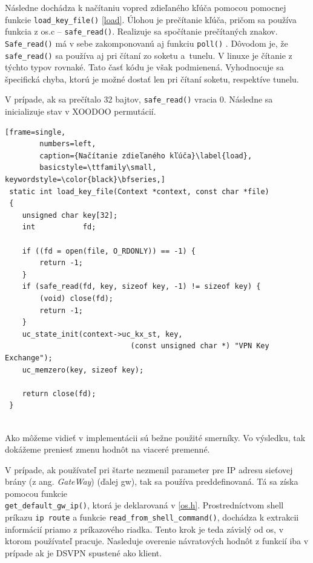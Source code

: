 Následne dochádza k načítaniu vopred zdieľaného kľúča pomocou pomocnej funkcie 
\lstinline|load_key_file()| \ref{load}. Úlohou je prečítanie kľúča, pričom sa používa funkcia z os.c -- \lstinline|safe_read()|. Realizuje sa spočítanie prečítaných znakov. \lstinline|Safe_read()| má v sebe zakomponovanú aj funkciu \lstinline|poll()| \cite{poll}. Dôvodom je, že \lstinline|safe_read()| sa používa aj pri čítaní zo soketu a~tunelu. V linuxe je čítanie z týchto typov rovnaké. Tato časť kódu je však podmienená. Vyhodnocuje sa špecifická chyba, ktorú je možné dostať len pri čítaní soketu, respektíve tunelu.  

V prípade, ak sa prečítalo 32 bajtov, \lstinline|safe_read()| vracia 0. Následne sa inicializuje stav v XOODOO permutácií.
 
 \begin{minipage}{\linewidth} 	
 	\begin{lstlisting}[frame=single,
 		numbers=left,
 		caption={Načítanie zdieľaného kľúča}\label{load},
 		basicstyle=\ttfamily\small, keywordstyle=\color{black}\bfseries,]
 static int load_key_file(Context *context, const char *file)
 {
 	unsigned char key[32];
 	int           fd;
 	
 	if ((fd = open(file, O_RDONLY)) == -1) {
 		return -1;
 	}
 	if (safe_read(fd, key, sizeof key, -1) != sizeof key) {
 		(void) close(fd);
 		return -1;
 	}
 	uc_state_init(context->uc_kx_st, key, 
 							 (const unsigned char *) "VPN Key Exchange");
 	uc_memzero(key, sizeof key);
 	
 	return close(fd);
 }
  	\end{lstlisting}
\end{minipage}\\ 
Ako môžeme vidieť v implementácii sú bežne použité smerníky. Vo výsledku, tak dokážeme preniesť zmenu hodnôt na viaceré premenné.
 
V prípade, ak používateľ pri štarte nezmenil parameter pre IP adresu sieťovej brány (z ang. \textit{GateWay}) (ďalej \acrshort{gw}), tak sa používa preddefinovaná. Tá sa získa pomocou funkcie \\\lstinline|get_default_gw_ip()|, ktorá je deklarovaná v \ref{os.h}. Prostredníctvom shell príkazu \lstinline|ip route| a funkcie \lstinline|read_from_shell_command()|, dochádza k extrakcii informácií priamo z príkazového riadka. Tento krok je teda závislý od \acrshort{os}, v ktorom používateľ pracuje. Nasleduje overenie návratových hodnôt z funkcií iba v prípade ak je DSVPN spustené ako klient.
 
